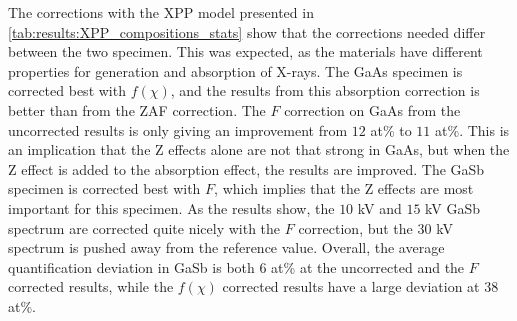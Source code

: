 The corrections with the XPP model presented in \cref{tab:results:XPP_compositions_stats} show that the corrections needed differ between the two specimen.
This was expected, as the materials have different properties for generation and absorption of X-rays.
The GaAs specimen is corrected best with $f(\chi)$, and the results from this absorption correction is better than from the ZAF correction.
The $F$ correction on GaAs from the uncorrected results is only giving an improvement from $12$ at\% to $11$ at\%.
This is an implication that the Z effects alone are not that strong in GaAs, but when the Z effect is added to the absorption effect, the results are improved.
The GaSb specimen is corrected best with $F$, which implies that the Z effects are most important for this specimen.
As the results show, the $10$ kV and $15$ kV GaSb spectrum are corrected quite nicely with the $F$ correction, but the $30$ kV spectrum is pushed away from the reference value.
Overall, the average quantification deviation in GaSb is both $6$ at\% at the uncorrected and the $F$ corrected results, while the $f(\chi)$ corrected results have a large deviation at $38$ at\%.



